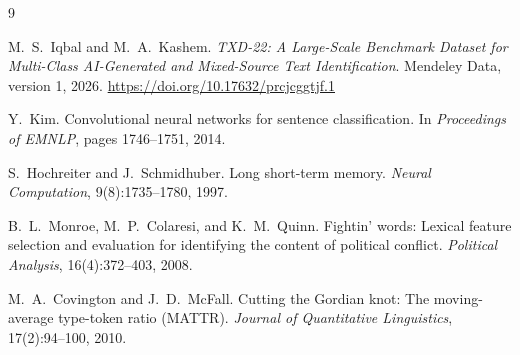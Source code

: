 \documentclass[11pt]{article}
\begin{document}
\begin{thebibliography}{9}\small\setlength{\itemsep}{1pt}

 M.~S.~Iqbal and M.~A.~Kashem. \emph{TXD-22: A Large-Scale Benchmark Dataset for Multi-Class
AI-Generated and Mixed-Source Text Identification}. Mendeley Data, version 1, 2026.
\url{https://doi.org/10.17632/prcjcggtjf.1}

 Y.~Kim. Convolutional neural networks for sentence classification. In \emph{Proceedings of
EMNLP}, pages 1746--1751, 2014.

 S.~Hochreiter and J.~Schmidhuber. Long short-term memory. \emph{Neural Computation},
9(8):1735--1780, 1997.

 B.~L.~Monroe, M.~P.~Colaresi, and K.~M.~Quinn. Fightin' words: Lexical feature selection
and evaluation for identifying the content of political conflict. \emph{Political Analysis}, 16(4):372--403, 2008.

 M.~A.~Covington and J.~D.~McFall. Cutting the Gordian knot: The moving-average
type-token ratio (MATTR). \emph{Journal of Quantitative Linguistics}, 17(2):94--100, 2010.

\end{thebibliography}
\end{document}
